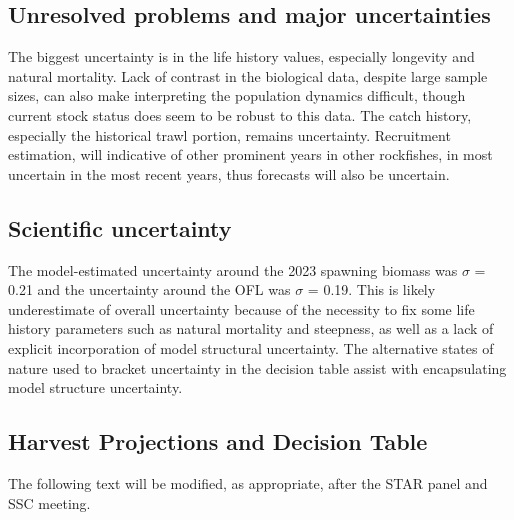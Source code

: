 \documentclass[11pt,
  english,
  letterpaper,
]{article}
\begin{document}


\clearpage

\hypertarget{unresolved-problems-and-major-uncertainties}{%
\subsection*{Unresolved problems and major uncertainties}\label{unresolved-problems-and-major-uncertainties}}

The biggest uncertainty is in the life history values, especially longevity and natural mortality. Lack of contrast in the biological data, despite large sample sizes, can also make interpreting the population dynamics difficult, though current stock status does seem to be robust to this data. The catch history, especially the historical trawl portion, remains uncertainty. Recruitment estimation, will indicative of other prominent years in other rockfishes, in most uncertain in the most recent years, thus forecasts will also be uncertain.

\hypertarget{scientific-uncertainty}{%
\subsection*{Scientific uncertainty}\label{scientific-uncertainty}}

The model-estimated uncertainty around the 2023 spawning biomass was \(\sigma\) = 0.21 and the uncertainty around the OFL was \(\sigma\) = 0.19. This is likely underestimate of overall uncertainty because of the necessity to fix some life history parameters such as natural mortality and steepness, as well as a lack of explicit incorporation of model structural uncertainty. The alternative states of nature used to bracket uncertainty in the decision table assist with encapsulating model structure uncertainty.

\hypertarget{harvest-projections-and-decision-table}{%
\subsection*{Harvest Projections and Decision Table}\label{harvest-projections-and-decision-table}}

The following text will be modified, as appropriate, after the STAR panel and SSC meeting.
\end{document}
